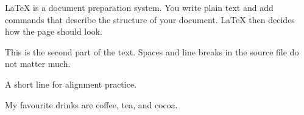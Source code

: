 \documentclass{article}
\begin{document}
LaTeX is a document preparation system. You write plain text and add
commands that describe the structure of your document.
LaTeX then decides how the page should look.

This is the second part of the text. Spaces    and
line breaks in the source file do not matter much.

A short line for alignment practice.

My favourite drinks are coffee, tea, and cocoa.
\end{document}
